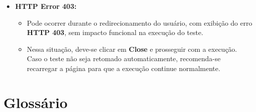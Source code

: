 \begin{itemize}
    \item \textbf{HTTP Error 403:}
    \begin{figure}[H]
        \centering
        \label{fig:http403}
    \end{figure}
    \begin{itemize}
        \item Pode ocorrer durante o redirecionamento do usuário, com exibição do erro \textbf{HTTP 403}, sem impacto funcional na execução do teste.
        \item Nessa situação, deve-se clicar em \textbf{Close} e prosseguir com a execução. Caso o teste não seja retomado automaticamente, recomenda-se recarregar a página para que a execução continue normalmente.
    \end{itemize}
\end{itemize}

\section{Glossário}

